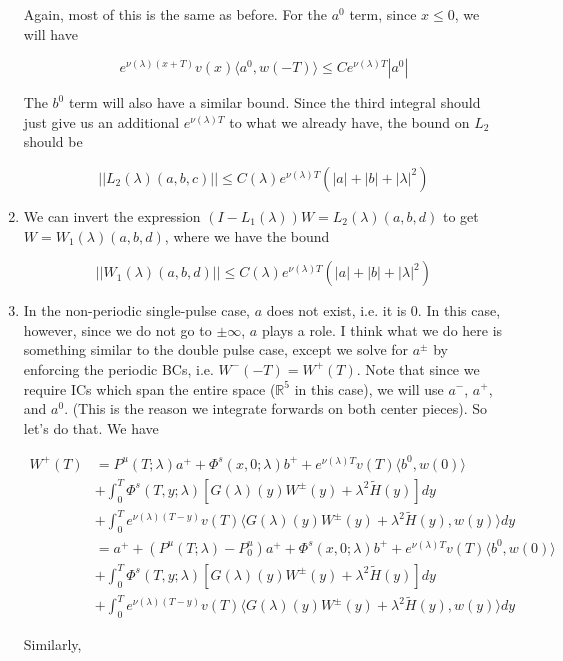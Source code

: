 \documentclass[12pt]{article}
\def\R{{\mathbb R}}
\begin{document}
\begin{enumerate}
Again, most of this is the same as before. For the $a^0$ term, since $x \leq 0$, we will have

\[
e^{\nu(\lambda)(x+T)} v(x) \langle a^0, w(-T) \rangle \leq C e^{\nu(\lambda)T} |a^0|  
\]

The $b^0$ term will also have a similar bound. Since the third integral should just give us an additional $e^{\nu(\lambda)T}$ to what we already have, the bound on $L_2$ should be

\[
||L_2(\lambda)(a,b,c)|| \leq C(\lambda) e^{\nu(\lambda)T} (|a| + |b| + |\lambda|^2)
\]

\item We can invert the expression $(I - L_1(\lambda))W = L_2(\lambda)(a,b,d)$ to get $W = W_1(\lambda)(a,b,d)$, where we have the bound

\[
||W_1(\lambda)(a,b,d)|| \leq C(\lambda) e^{\nu(\lambda)T} (|a| + |b| + |\lambda|^2)
\]

\item In the non-periodic single-pulse case, $a$ does not exist, i.e. it is 0. In this case, however, since we do not go to $\pm \infty$, $a$ plays a role. I think what we do here is something similar to the double pulse case, except we solve for $a^\pm$ by enforcing the periodic BCs, i.e. $W^-(-T) = W^+(T)$. Note that since we require ICs which span the entire space ($\R^5$ in this case), we will use $a^-$, $a^+$, and $a^0$. (This is the reason we integrate forwards on both center pieces). So let's do that. We have 

\begin{align*}
W^+(T) &= P^u(T; \lambda)a^+ + \Phi^s(x, 0; \lambda)b^+ + e^{\nu(\lambda)T} v(T) \langle b^0, w(0) \rangle  \\
&+ \int_0^T \Phi^s(T, y; \lambda) [ G(\lambda)(y)W^\pm(y) + \lambda^2 \tilde{H}(y) ] dy \\
&+ \int_0^T 
e^{\nu(\lambda)(T-y)} v(T) \langle G(\lambda)(y)W^\pm(y) + \lambda^2 \tilde{H}(y), w(y) \rangle  dy \\
&= a^+ + (P^u(T; \lambda) - P^u_0)a^+ + \Phi^s(x, 0; \lambda)b^+ + e^{\nu(\lambda)T} v(T) \langle b^0, w(0) \rangle  \\
&+ \int_0^T \Phi^s(T, y; \lambda) [ G(\lambda)(y)W^\pm(y) + \lambda^2 \tilde{H}(y) ] dy \\
&+ \int_0^T 
e^{\nu(\lambda)(T-y)} v(T) \langle G(\lambda)(y)W^\pm(y) + \lambda^2 \tilde{H}(y), w(y) \rangle  dy 
\end{align*}

Similarly,


\end{enumerate}
\end{document}
